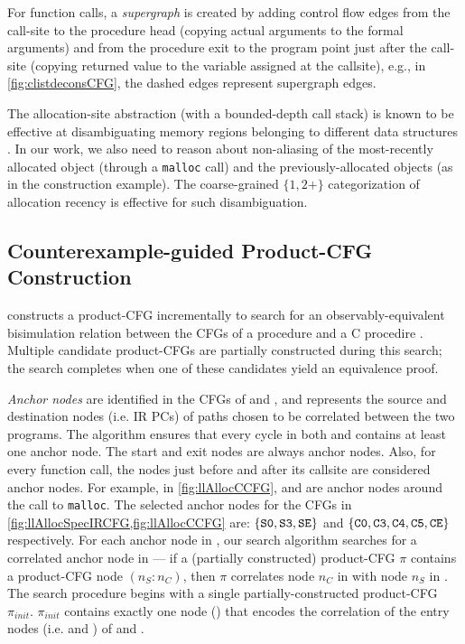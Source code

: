 For function calls, a {\em supergraph} is created by adding control flow edges
from the call-site to the procedure head (copying actual arguments to the formal arguments) and
from the procedure exit to the program point just after the
call-site (copying returned value to the variable assigned at the callsite),
e.g., in \cref{fig:clistdeconsCFG}, the dashed edges represent supergraph edges.

The allocation-site abstraction (with a bounded-depth call stack) is
known to be effective at disambiguating memory regions belonging to
different data structures
\cite{allocationSiteAbstraction82,allocationSiteAbstraction90,allocationSiteAbstraction06}.
In our work, we also need to reason about non-aliasing
of the most-recently allocated object (through a {\tt malloc} call) and
the previously-allocated objects (as in the 
construction example). The coarse-grained $\{1, 2+\}$
categorization of allocation recency is effective for such disambiguation.

\subsection{Counterexample-guided Product-CFG Construction}
\label{sec:searchalgo}
\toolName{} constructs a product-CFG incrementally to search for an observably-equivalent
bisimulation relation between the CFGs of a \SpecL{} procedure \sprog{} and a C procedire \cprog{}.
Multiple candidate product-CFGs are partially constructed during this search;
the search completes when one of these candidates yield an equivalence proof.

{\em Anchor nodes} are identified in the CFGs of \sprog{} and \cprog{}, and represents the
source and destination nodes (i.e. IR PCs)
of paths chosen to be correlated between the two programs.
The algorithm ensures that every cycle in both \sprog{} and \cprog{} contains at least one anchor node.
The start and exit nodes are always anchor nodes.
Also, for every function call, the nodes just before and after its callsite are considered anchor nodes.
For example, in \cref{fig:llAllocCCFG},  and  are anchor nodes around the call to {\tt malloc}.
The selected anchor nodes for the CFGs in \cref{fig:llAllocSpecIRCFG,fig:llAllocCCFG} are:
$\{ {\tt S0},{\tt S3},{\tt SE} \}$ and $\{ {\tt C0}, {\tt C3}, {\tt C4}, {\tt C5}, {\tt CE} \}$ respectively.
For each anchor node in \cprog{}, our search algorithm searches for a correlated anchor node in \sprog{} --- if
a (partially constructed) product-CFG $\pi$ contains a product-CFG node  $(n_S\!:\!n_C)$, then $\pi$
correlates node $n_C$ in \cprog{} with node $n_S$ in \sprog{}.
The search procedure begins with a single partially-constructed product-CFG $\pi_{init}$.
$\pi_{init}$ contains exactly one node () that encodes the correlation of the entry nodes
(i.e.  and ) of \sprog{} and \cprog{}.

